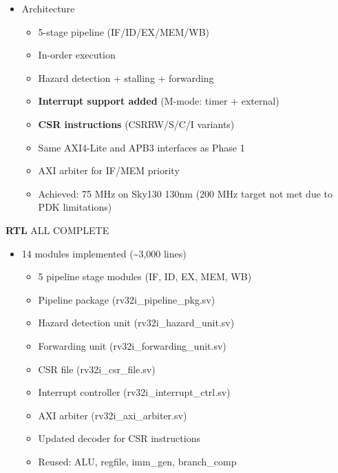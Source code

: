 \begin{record}

\begin{itemize}
\tightlist
\item
  Architecture

  \begin{itemize}
  \tightlist
  \item
    5-stage pipeline
    (IF/\allowbreak{}ID/\allowbreak{}EX/\allowbreak{}MEM/\allowbreak{}WB)
  \item
    In-order execution
  \item
    Hazard detection + stalling + forwarding
  \item
    \textbf{Interrupt support added} (M-mode: timer + external)
  \item
    \textbf{CSR instructions}
    (CSRRW/\allowbreak{}S/\allowbreak{}C/\allowbreak{}I variants)
  \item
    Same AXI4-Lite and APB3 interfaces as Phase 1
  \item
    AXI arbiter for IF/MEM priority
  \item
    Achieved: 75 MHz on Sky130 130nm (200 MHz target not met due to PDK
    limitations)
  \end{itemize}
\end{itemize}

\textbf{RTL} \ok{} ALL COMPLETE

\begin{itemize}
\tightlist
\item
  \ok{} 14 modules implemented (\textasciitilde3,000 lines)

  \begin{itemize}
  \tightlist
  \item
    \ok{} 5 pipeline stage modules (IF, ID, EX, MEM, WB)
  \item
    \ok{} Pipeline package
    (rv32i\_\allowbreak{}pipeline\_\allowbreak{}pkg.sv)
  \item
    \ok{} Hazard detection unit
    (rv32i\_\allowbreak{}hazard\_\allowbreak{}unit.sv)
  \item
    \ok{} Forwarding unit
    (rv32i\_\allowbreak{}forwarding\_\allowbreak{}unit.sv)
  \item
    \ok{} CSR file (rv32i\_\allowbreak{}csr\_\allowbreak{}file.sv)
  \item
    \ok{} Interrupt controller
    (rv32i\_\allowbreak{}interrupt\_\allowbreak{}ctrl.sv)
  \item
    \ok{} AXI arbiter (rv32i\_\allowbreak{}axi\_\allowbreak{}arbiter.sv)
  \item
    \ok{} Updated decoder for CSR instructions
  \item
    \ok{} Reused: ALU, regfile, imm\_gen, branch\_\allowbreak{}comp
  \end{itemize}
\end{itemize}


\end{record}
